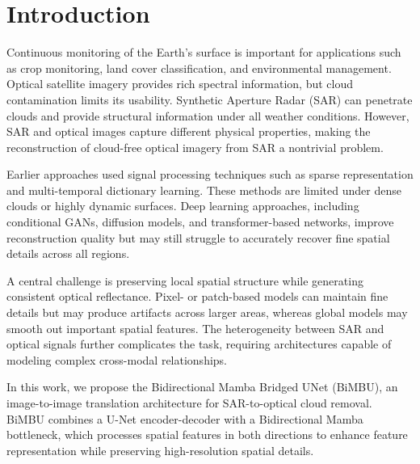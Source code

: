 \section{Introduction}

Continuous monitoring of the Earth's surface is important for applications such as crop monitoring, land cover classification, and environmental management. Optical satellite imagery provides rich spectral information, but cloud contamination limits its usability. Synthetic Aperture Radar (SAR) can penetrate clouds and provide structural information under all weather conditions. However, SAR and optical images capture different physical properties, making the reconstruction of cloud-free optical imagery from SAR a nontrivial problem.

Earlier approaches used signal processing techniques such as sparse representation and multi-temporal dictionary learning. These methods are limited under dense clouds or highly dynamic surfaces. Deep learning approaches, including conditional GANs, diffusion models, and transformer-based networks, improve reconstruction quality but may still struggle to accurately recover fine spatial details across all regions.

A central challenge is preserving local spatial structure while generating consistent optical reflectance. Pixel- or patch-based models can maintain fine details but may produce artifacts across larger areas, whereas global models may smooth out important spatial features. The heterogeneity between SAR and optical signals further complicates the task, requiring architectures capable of modeling complex cross-modal relationships.

In this work, we propose the Bidirectional Mamba Bridged UNet (BiMBU), an image-to-image translation architecture for SAR-to-optical cloud removal. BiMBU combines a U-Net encoder-decoder with a Bidirectional Mamba bottleneck, which processes spatial features in both directions to enhance feature representation while preserving high-resolution spatial details.


